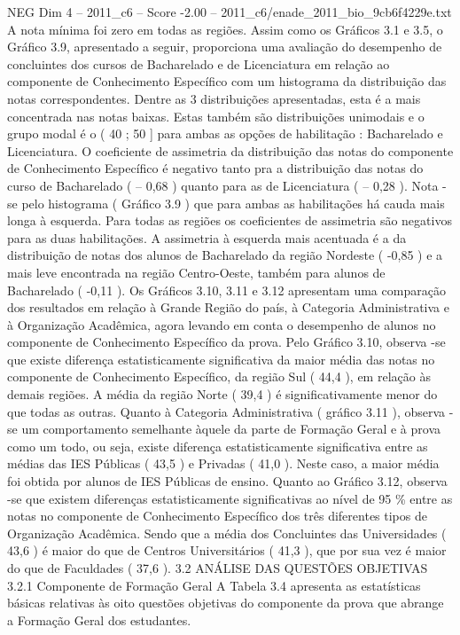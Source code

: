 \begin{textsample}{NEG Dim 4 – 2011\_c6 – Score -2.00 – 2011\_c6/enade\_2011\_bio\_9cb6f4229e.txt}
A nota mínima foi zero em todas as regiões.
Assim como os Gráficos 3.1 e 3.5, o Gráfico 3.9, apresentado a seguir, proporciona uma avaliação do desempenho de concluintes dos cursos de Bacharelado e de Licenciatura em relação ao componente de Conhecimento Específico com um histograma da distribuição das notas correspondentes.
Dentre as 3 distribuições apresentadas, esta é a mais concentrada nas notas baixas.
Estas também são distribuições unimodais e o grupo modal é o ( 40 ; 50 ] para ambas as opções de habilitação : Bacharelado e Licenciatura.
O coeficiente de assimetria da distribuição das notas do componente de Conhecimento Específico é negativo tanto pra a distribuição das notas do curso de Bacharelado ( – 0,68 ) quanto para as de Licenciatura ( – 0,28 ).
Nota -se pelo histograma ( Gráfico 3.9 ) que para ambas as habilitações há cauda mais longa à esquerda.
Para todas as regiões os coeficientes de assimetria são negativos para as duas habilitações.
A assimetria à esquerda mais acentuada é a da distribuição de notas dos alunos de Bacharelado da região Nordeste ( -0,85 ) e a mais leve encontrada na região Centro-Oeste, também para alunos de Bacharelado ( -0,11 ).
Os Gráficos 3.10, 3.11 e 3.12 apresentam uma comparação dos resultados em relação à Grande Região do país, à Categoria Administrativa e à Organização Acadêmica, agora levando em conta o desempenho de alunos no componente de Conhecimento Específico da prova.
Pelo Gráfico 3.10, observa -se que existe diferença estatisticamente significativa da maior média das notas no componente de Conhecimento Específico, da região Sul ( 44,4 ), em relação às demais regiões.
A média da região Norte ( 39,4 ) é significativamente menor do que todas as outras.
Quanto à Categoria Administrativa ( gráfico 3.11 ), observa -se um comportamento semelhante àquele da parte de Formação Geral e à prova como um todo, ou seja, existe diferença estatisticamente significativa entre as médias das IES Públicas ( 43,5 ) e Privadas ( 41,0 ).
Neste caso, a maior média foi obtida por alunos de IES Públicas de ensino.
Quanto ao Gráfico 3.12, observa -se que existem diferenças estatisticamente significativas ao nível de 95 \% entre as notas no componente de Conhecimento Específico dos três diferentes tipos de Organização Acadêmica.
Sendo que a média dos Concluintes das Universidades ( 43,6 ) é maior do que de Centros Universitários ( 41,3 ), que por sua vez é maior do que de Faculdades ( 37,6 ). 3.2 ANÁLISE DAS QUESTÕES OBJETIVAS 3.2.1 Componente de Formação Geral A Tabela 3.4 apresenta as estatísticas básicas relativas às oito questões objetivas do componente da prova que abrange a Formação Geral dos estudantes.

\end{textsample}
